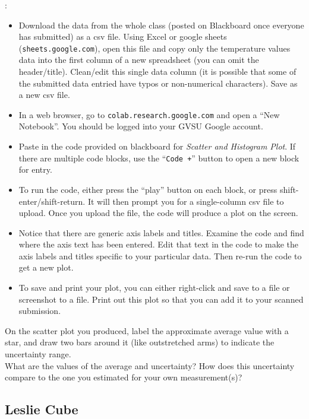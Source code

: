 :
%
\begin{itemize}
\item Download the data from the whole class (posted on Blackboard once everyone has submitted) as a csv file.  Using Excel or google sheets (\verb|sheets.google.com|), open this file and copy only the temperature values data into the first column of a new spreadsheet (you can omit the header/title).  Clean/edit this single data column (it is possible that some of the submitted data entried have typos or non-numerical characters). Save as a new csv file.
\item In a web browser, go to \verb|colab.research.google.com| and open a ``New Notebook''.  You should be logged into your GVSU Google account.
\item Paste in the code provided on blackboard for {\em Scatter and Histogram Plot}.  If there are multiple code blocks, use the ``\verb|Code +|'' button to open a new block for entry.
\item To run the code, either press the ``play'' button on each block, or press shift-enter/shift-return.  It will then prompt you for a single-column csv file to upload. Once you upload the file, the code will produce a plot on the screen.
\item Notice that there are generic axis labels and titles.  Examine the code and find where the axis text has been entered.  Edit that text in the code to make the axis labels and titles  specific to your particular data. Then re-run the code to get a new plot.
\item To save and print your plot, you can either right-click and save to a file or screenshot to a file.  Print out this plot so that you can add it to your scanned submission.
\end{itemize}

\noindent On the scatter plot you produced, label the approximate average value with a star, and draw two bars around it (like outstretched arms) to indicate the uncertainty range. \\

\noindent What are the values of the average and uncertainty? How does this uncertainty compare to the one you estimated for your own measurement(s)?

\answerspace[3cm]



\subsection{Leslie Cube}

